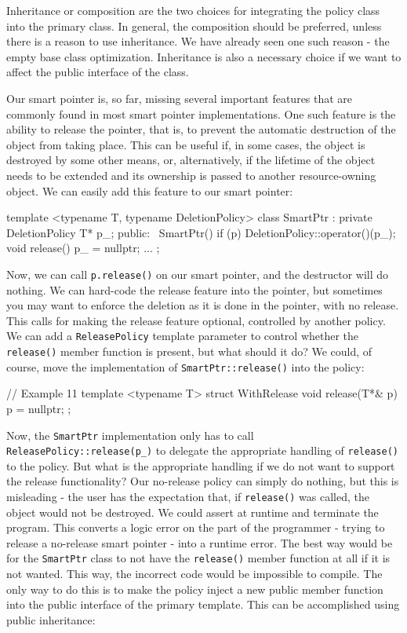 Inheritance or composition are the two choices for integrating the policy class into the primary class. In general, the composition should be preferred, unless there is a reason to use inheritance. We have already seen one such reason - the empty base class optimization. Inheritance is also a necessary choice if we want to affect the public interface of the class.

Our smart pointer is, so far, missing several important features that are commonly found in most smart pointer implementations. One such feature is the ability to release the pointer, that is, to prevent the automatic destruction of the object from taking place. This can be useful if, in some cases, the object is destroyed by some other means, or, alternatively, if the lifetime of the object needs to be extended and its ownership is passed to another resource-owning object. We can easily add this feature to our smart pointer:

\begin{code}
template <typename T,
          typename DeletionPolicy>
class SmartPtr : private DeletionPolicy {
  T* p_;
  public:
  ~SmartPtr() {
    if (p) DeletionPolicy::operator()(p_);
  }
  void release() { p_ = nullptr; }
  ...
};
\end{code}

Now, we can call \texttt{p.release()} on our smart pointer, and the destructor will do nothing. We can hard-code the release feature into the pointer, but sometimes you may want to enforce the deletion as it is done in the pointer, with no release. This calls for making the release feature optional, controlled by another policy. We can add a \texttt{ReleasePolicy} template parameter to control whether the \texttt{release()} member function is present, but what should it do? We could, of course, move the implementation of \texttt{SmartPtr::release()} into the policy:

\begin{code}
// Example 11
template <typename T> struct WithRelease {
  void release(T*& p) { p = nullptr; }
};
\end{code}

Now, the \texttt{SmartPtr} implementation only has to call \texttt{ReleasePolicy::release(p\_)} to delegate the appropriate handling of \texttt{release()} to the policy. But what is the appropriate handling if we do not want to support the release functionality? Our no-release policy can simply do nothing, but this is misleading - the user has the expectation that, if \texttt{release()} was called, the object would not be destroyed. We could assert at runtime and terminate the program. This converts a logic error on the part of the programmer - trying to release a no-release smart pointer - into a runtime error. The best way would be for the \texttt{SmartPtr} class to not have the \texttt{release()} member function at all if it is not wanted. This way, the incorrect code would be impossible to compile. The only way to do this is to make the policy inject a new public member function into the public interface of the primary template. This can be accomplished using public inheritance:


